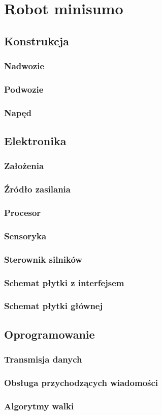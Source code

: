 \chapter{Robot minisumo}
\section{Konstrukcja}
\subsection{Nadwozie}

\subsection{Podwozie}

\subsection{Napęd}

\section{Elektronika}
\subsection{Założenia}
\subsection{Źródło zasilania}
\subsection{Procesor}
\subsection{Sensoryka}
\subsection{Sterownik silników}
\subsection{Schemat płytki z interfejsem}
\subsection{Schemat płytki głównej}

\section{Oprogramowanie}
\subsection{Transmisja danych}
\subsection{Obsługa przychodzących wiadomości}
\subsection{Algorytmy walki}
